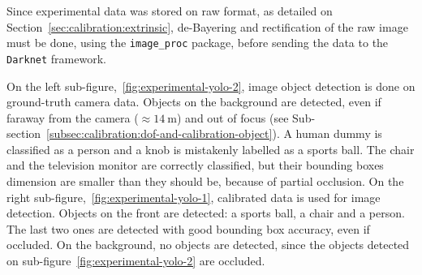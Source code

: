 Since experimental data was stored on raw format, as detailed on Section~\ref{sec:calibration:extrinsic}, de-Bayering and rectification of the raw image must be done, using the \texttt{image\_proc} package, before sending the data to the \texttt{Darknet} framework.

On the left sub-figure,~\ref{fig:experimental-yolo-2}, image object detection is done on ground-truth camera data. Objects on the background are detected, even if faraway from the camera ($\approx\SI{14}{\meter}$) and out of focus (see Sub-section~\ref{subsec:calibration:dof-and-calibration-object}). A human dummy is classified as a person and a knob is mistakenly labelled as a sports ball. The chair and the television monitor are correctly classified, but their bounding boxes dimension are smaller than they should be, because of partial occlusion.
On the right sub-figure,~\ref{fig:experimental-yolo-1}, calibrated data is used for image detection. Objects on the front are detected: a sports ball, a chair and a person. The last two ones are detected with good bounding box accuracy, even if occluded. On the background, no objects are detected, since the objects detected on sub-figure~\ref{fig:experimental-yolo-2} are occluded. 

